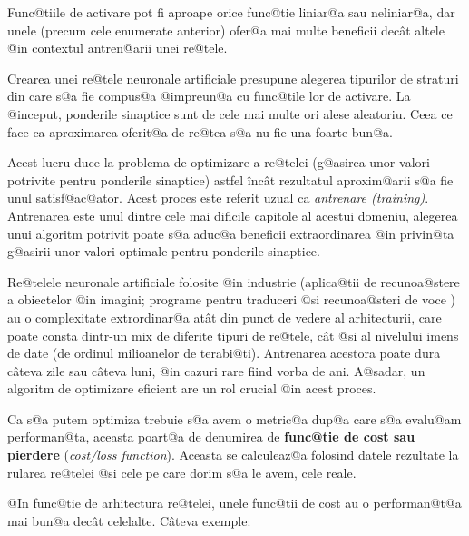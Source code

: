 Func@tiile de activare pot fi aproape orice func@tie liniar@a sau neliniar@a, dar unele  (precum cele enumerate anterior) ofer@a mai multe beneficii dec\^ at altele @in contextul antren@arii unei re@tele.

Crearea unei re@tele neuronale artificiale presupune alegerea tipurilor de straturi din care s@a fie compus@a @impreun@a cu func@tile lor de activare. La @inceput, ponderile sinaptice sunt de cele mai multe ori alese aleatoriu. Ceea ce face ca aproximarea oferit@a de re@tea s@a nu fie una foarte bun@a.

Acest lucru duce la problema de optimizare a re@telei (g@asirea unor valori potrivite pentru ponderile sinaptice) astfel \^inc\^ at rezultatul aproxim@arii s@a fie unul satisf@ac@ator. Acest proces este referit uzual ca {\sl antrenare (training)}. Antrenarea este unul dintre cele mai dificile capitole al acestui domeniu, alegerea unui algoritm potrivit poate s@a aduc@a beneficii extraordinarea @in privin@ta g@asirii unor valori optimale pentru ponderile sinaptice.

Re@telele neuronale artificiale folosite @in industrie (aplica@tii de recunoa@stere a obiectelor @in imagini; programe pentru traduceri @si recunoa@steri de voce ) au o complexitate extrordinar@a at\^ at din punct de vedere al arhitecturii, care poate consta dintr-un mix de diferite tipuri de re@tele, c\^ at @si al nivelului imens de date (de ordinul milioanelor de terabi@ti). Antrenarea acestora poate dura c\^ ateva zile sau c\^ ateva luni, @in cazuri rare fiind vorba de ani. A@sadar, un algoritm de optimizare eficient are un rol crucial @in acest proces.

Ca s@a putem optimiza trebuie s@a avem o metric@a dup@a care s@a evalu@am performan@ta, aceasta poart@a de denumirea de \textbf{func@tie de cost sau pierdere} (\textsl{cost/loss function}). Aceasta se calculeaz@a folosind datele rezultate la rularea re@telei @si cele pe care dorim s@a le avem, cele reale. 

@In func@tie de arhitectura re@telei, unele func@tii de cost au o performan@t@a mai bun@a dec\^ at celelalte. C\^ ateva exemple:

